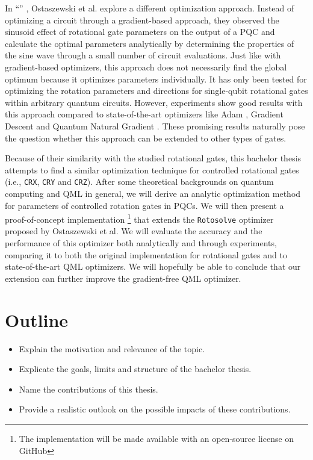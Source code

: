 In ``\emph{}''
\cite{ostaszewski_structure_2021}, Ostaszewski et al. explore a different
optimization approach.
Instead of optimizing a circuit through a gradient-based approach, they observed
the sinusoid effect of rotational gate parameters on the output of a PQC and
calculate the optimal parameters analytically by determining the properties of
the sine wave through a small number of circuit evaluations. 
Just like with gradient-based optimizers, this approach does not necessarily
find the global optimum because it optimizes parameters individually.
It has only been tested for optimizing the rotation parameters and directions
for single-qubit rotational gates within arbitrary quantum circuits.
However, experiments show good results with this approach compared to
state-of-the-art optimizers like Adam \cite{kingma_adam_2017},
Gradient Descent and Quantum Natural Gradient \cite{stokes_quantum_2020}.
These promising results naturally pose the question whether this approach can be
extended to other types of gates.

Because of their similarity with the studied rotational gates, this bachelor
thesis attempts to find a similar optimization technique for controlled
rotational gates (i.e., \texttt{CRX}, \texttt{CRY} and \texttt{CRZ}).
After some theoretical backgrounds on quantum computing and QML in general, we
will derive an analytic optimization method for parameters of controlled
rotation gates in PQCs.
We will then present a proof-of-concept implementation%
\footnote{The implementation will be made available with an open-source license
on GitHub}
that extends the \texttt{Rotosolve} optimizer proposed by Ostaszewski et al.
We will evaluate the accuracy and the performance of this optimizer both
analytically and through experiments, comparing it to both the original
implementation for rotational gates and to state-of-the-art QML optimizers.
We will hopefully be able to conclude that our extension can further improve the
gradient-free QML optimizer.

\section{Outline}
\begin{itemize}
    \item
        Explain the motivation and relevance of the topic.
    \item
        Explicate the goals, limits and structure of the bachelor thesis.
    \item
        Name the contributions of this thesis.
    \item
        Provide a realistic outlook on the possible impacts of these
        contributions.
\end{itemize}
